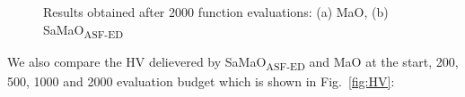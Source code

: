 \documentclass[onecolumn,10pt]{asme2ej}
\begin{document}
\begin{figure}[!htb]
	\centering    
	\caption{Results obtained after 2000 function evaluations: (a) MaO, (b) SaMaO\textsubscript{ASF-ED}}
	\label{fig:2000}
\end{figure}

\clearpage

We also compare the HV delievered by SaMaO\textsubscript{ASF-ED} and MaO at the start, 200, 500, 1000 and 2000 evaluation budget which is shown in Fig.~\ref{fig:HV}:
\end{document}
